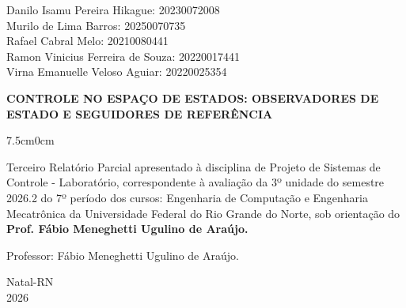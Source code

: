 \documentclass[a4paper,12pt]{article}
\begin{document}
\newpage


\thispagestyle{empty}

\begin{center}
\begin{normalsize}
Danilo Isamu Pereira Hikague: 20230072008\\
\vspace{0.8cm}
Murilo de Lima Barros: 20250070735\\
\vspace{0.8cm}
Rafael Cabral Melo: 20210080441\\
\vspace{0.8cm}
Ramon Vinicius Ferreira de Souza: 20220017441\\
\vspace{0.8cm}
Virna Emanuelle Veloso Aguiar: 20220025354\\

\end{normalsize}
\end{center}
\vspace{3cm}

{\bf{\large {\centering CONTROLE NO ESPAÇO DE ESTADOS: OBSERVADORES DE ESTADO E SEGUIDORES DE REFERÊNCIA\\
}}}

\vspace{3.8cm}

\begin{adjustwidth}{7.5cm}{0cm}

{\normalsize

Terceiro Relatório Parcial apresentado à disciplina de
Projeto de Sistemas de Controle - Laboratório, correspondente à
avaliação da 3º unidade do semestre 2026.2 do 7º período
dos cursos: Engenharia de Computação e Engenharia Mecatrônica da
Universidade Federal do Rio Grande do Norte, sob
orientação do {\bf Prof. Fábio Meneghetti Ugulino de
Araújo.}

}

\end{adjustwidth}

\vspace{2cm}

\begin{center}

Professor: Fábio Meneghetti Ugulino de Araújo.

\vspace{2.5cm}

{\large Natal-RN\\
2026}

\end{center}
\end{document}
